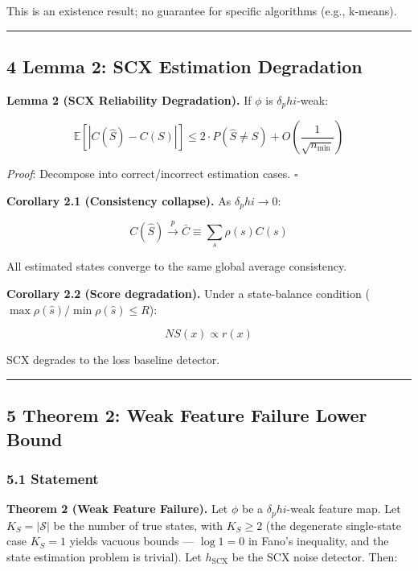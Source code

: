 \documentclass[
  12pt,
]{ctexart}
\begin{document}
This is an existence result; no guarantee for specific algorithms (e.g.,
k-means).

\begin{center}\rule{0.5\linewidth}{0.5pt}\end{center}

\subsection{4 Lemma 2: SCX Estimation
Degradation}\label{lemma-2-scx-estimation-degradation}

\textbf{Lemma 2 (SCX Reliability Degradation).} If \(\phi\) is
\(\delta_phi\)-weak:

\[\mathbb{E}\left[|C(\hat{S}) - C(S)|\right] \leq 2 \cdot P(\hat{S} \neq S) + O\!\left(\frac{1}{\sqrt{n_{\min}}}\right)\]

\emph{Proof}: Decompose into correct/incorrect estimation cases.
\(\square\)

\textbf{Corollary 2.1 (Consistency collapse).} As \(\delta_phi \to 0\):

\[C(\hat{S}) \xrightarrow{p} \bar{C} \equiv \sum_{s} \rho(s) C(s)\]

All estimated states converge to the same global average consistency.

\textbf{Corollary 2.2 (Score degradation).} Under a state-balance
condition (\(\max \rho(\hat{s}) / \min \rho(\hat{s}) \leq R\)):

\[NS(x) \propto r(x)\]

SCX degrades to the loss baseline detector.

\begin{center}\rule{0.5\linewidth}{0.5pt}\end{center}

\subsection{5 Theorem 2: Weak Feature Failure Lower
Bound}\label{theorem-2-weak-feature-failure-lower-bound}

\subsubsection{5.1 Statement}\label{statement}

\textbf{Theorem 2 (Weak Feature Failure).} Let \(\phi\) be a
\(\delta_phi\)-weak feature map. Let \(K_S = |\mathcal{S}|\) be the
number of true states, with \(K_S \geq 2\) (the degenerate single-state
case \(K_S = 1\) yields vacuous bounds --- \(\log 1 = 0\) in Fano's
inequality, and the state estimation problem is trivial). Let
\(h_{\text{SCX}}\) be the SCX noise detector. Then:
\end{document}
